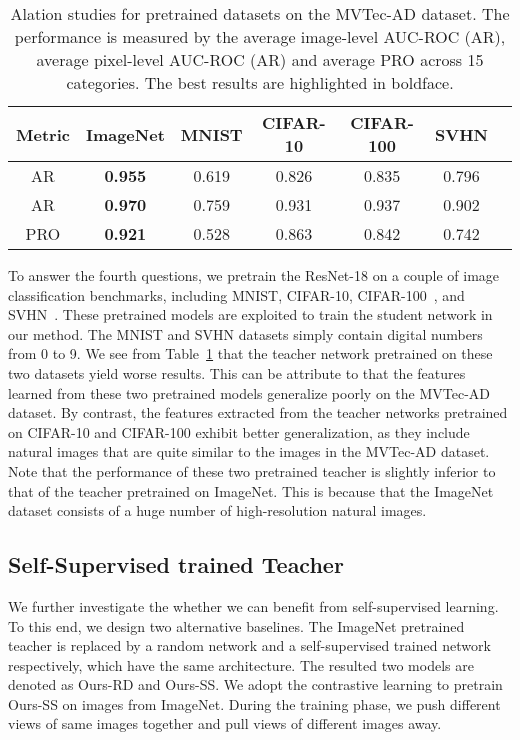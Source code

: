 \documentclass[final]{cvpr}
\begin{document}
{\begin{table}[!]
	\centering
	\caption{Alation studies for pretrained datasets on the MVTec-AD dataset. The performance is measured by the average image-level AUC-ROC (AR), average pixel-level AUC-ROC (AR) and average PRO across 15 categories. The best results are highlighted in boldface. }
	\label{tab8}
	\vspace{0.5em}
	\begin{adjustbox}{width=0.48\textwidth}
		\begin{tabular}{c|cccccc}
			\hline
			Metric & ImageNet & MNIST & CIFAR-10 & CIFAR-100 & SVHN\\
			\hline
			AR & \textbf{0.955} & 0.619 & 0.826 & 0.835 & 0.796\\
			AR & \textbf{0.970} & 0.759 & 0.931 & 0.937 & 0.902\\
			PRO & \textbf{0.921} & 0.528  & 0.863 & 0.842 & 0.742\\
			\hline
		\end{tabular}
	\end{adjustbox}
\end{table}

To answer the fourth questions, we pretrain the ResNet-18 on a couple of image classification benchmarks, including MNIST, CIFAR-10, CIFAR-100~\cite{Krizhevsky2009}, and SVHN~\cite{Netzer2011}. These pretrained models are exploited to train the student network in our method. The MNIST and SVHN datasets simply contain digital numbers from 0 to 9. We see from Table~\ref{tab8} that the teacher network pretrained on these two datasets yield worse results. This can be attribute to that the features learned from these two pretrained models generalize poorly on the MVTec-AD dataset. By contrast, the features extracted from the teacher networks pretrained on CIFAR-10 and CIFAR-100 exhibit better generalization, as they include natural images that are quite similar to the images in the MVTec-AD dataset. Note that the performance of these two pretrained teacher is slightly inferior to that of the teacher pretrained on ImageNet. This is because that the ImageNet dataset consists of a huge number of high-resolution natural images.



\iffalse
\subsection{Self-Supervised trained Teacher}
\label{sec5-sub4}

We further investigate the whether we can benefit from self-supervised learning. To this end, we design two alternative baselines. The ImageNet pretrained teacher is replaced by a random network and a self-supervised trained network respectively, which have the same architecture. The resulted two models are denoted as Ours-RD and Ours-SS. We adopt the contrastive learning \cite{He2020} to pretrain Ours-SS on images from ImageNet. During the training phase, we push different views of same images together and pull views of different images away.

}
\end{document}
